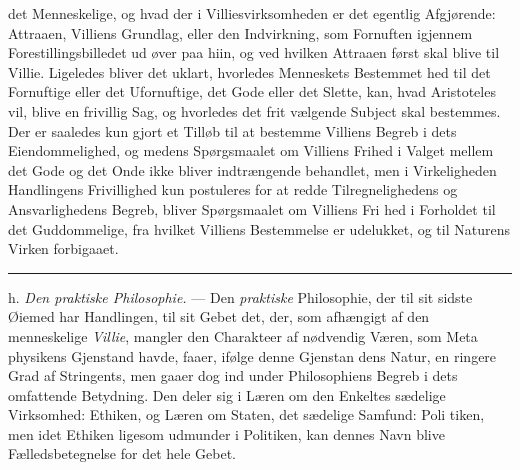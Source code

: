 \documentclass[12pt,a4paper]{book}
\newcommand{\divrule}{\begin{center}\rule{2cm}{0.4pt}\end{center}}
\newcommand{\gk}[1]{\textit{#1}}
\begin{document}
det Menneskelige, og hvad der i Villiesvirksomheden er det
egentlig Afgjørende: Attraaen, Villiens Grundlag, eller den
Indvirkning, som Fornuften igjennem Forestillingsbilledet ud\-%
øver paa hiin, og ved hvilken Attraaen først skal blive til Villie.
Ligeledes bliver det uklart, hvorledes Menneskets Bestemmet\-%
hed til det Fornuftige eller det Ufornuftige, det Gode eller det
Slette, kan, hvad Aristoteles vil, blive en frivillig Sag, og
hvorledes det frit vælgende Subject skal bestemmes. Der er
saaledes kun gjort et Tilløb til at bestemme Villiens Begreb i
dets Eiendommelighed, og medens Spørgsmaalet om Villiens
Frihed i Valget mellem det Gode og det Onde ikke bliver
indtrængende behandlet, men i Virkeligheden Handlingens
Frivillighed kun postuleres for at redde Tilregnelighedens og
Ansvarlighedens Begreb, bliver Spørgsmaalet om Villiens Fri\-%
hed i Forholdet til det Guddommelige, fra hvilket Villiens
Bestemmelse er udelukket, og til Naturens Virken forbigaaet.

\divrule

h. \emph{Den praktiske Philosophie.} --- Den \emph{praktiske}
Philosophie, der til sit sidste Øiemed har Handlingen, til sit
Gebet det, der, som afhængigt af den menneskelige \emph{Villie},
mangler den Charakteer af nødvendig Væren, som Meta\-%
physikens Gjenstand havde, faaer, ifølge denne Gjenstan\-%
dens Natur, en ringere Grad af Stringents, men gaaer dog
ind under Philosophiens Begreb i dets omfattende Betydning.
Den deler sig i Læren om den Enkeltes sædelige Virksomhed:
Ethiken, og Læren om Staten, det sædelige Samfund: Poli\-%
tiken, men idet Ethiken ligesom udmunder i Politiken, kan
dennes Navn blive Fælledsbetegnelse for det hele Gebet.
\end{document}
